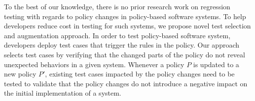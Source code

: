 To the best of our knowledge, there is no prior research
work on regression testing with regards to policy changes in policy-based software systems.
To help developers reduce cost in testing for such systems,
we propose novel test selection and augmentation approach. 
In order to test policy-based software system,
developers deploy test cases that trigger the rules in the policy.
Our approach selects test cases by verifying that the changed parts of 
the policy do not reveal unexpected behaviors in a given system.
Whenever a policy $P$ is updated to a new policy $P'$,
existing test cases impacted by the policy changes need to be tested to validate that the policy changes do not introduce a negative impact on the initial implementation of a system.





